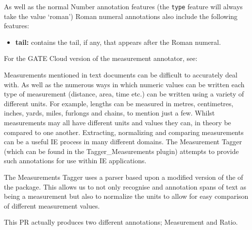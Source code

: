 As well as the normal Number annotation features (the \texttt{type} feature will
always take the value `roman') Roman numeral annotations also include the
following features:

\begin{itemize}
\item \textbf{tail:} contains the tail, if any, that appears after the Roman numeral.
\end{itemize}


For the GATE Cloud version of the measurement annotator, see: \\

Measurements mentioned in text documents can be difficult to accurately deal
with. As well as the numerous ways in which numeric values can be written each
type of measurement (distance, area, time etc.) can be written using a variety
of different units.
For example, lengths can be measured in metres, centimetres, inches, yards,
miles, furlongs and chains, to mention just a few.
Whilst measurements may all have different units and values they can, in theory
be compared to one another. Extracting, normalizing and comparing measurements
can be a useful IE process in many different domains. The Measurement Tagger
(which can be found in the Tagger\_Measurements plugin) attempts to provide such
annotations for use within IE applications.

The Measurements Tagger uses a parser based upon a modified version of the
 of the
 package. This allows us
to not only recognise and annotation spans of text as being a measurement but
also to normalize the units to allow for easy comparison of different
measurement values.

This PR actually produces two different annotations; Measurement and Ratio.

